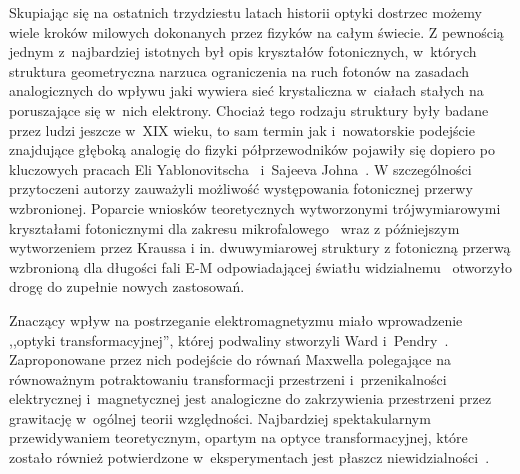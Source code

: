
Skupiając się na ostatnich trzydziestu latach historii optyki dostrzec możemy wiele kroków milowych dokonanych przez fizyków na całym świecie. Z pewnością jednym z~najbardziej istotnych był opis kryształów fotonicznych, w~których struktura geometryczna narzuca ograniczenia na ruch fotonów na zasadach analogicznych do wpływu jaki wywiera sieć krystaliczna w~ciałach stałych na poruszające się w~nich elektrony. Chociaż tego rodzaju struktury były badane przez ludzi jeszcze w~XIX wieku, to sam termin jak i~nowatorskie podejście znajdujące głęboką analogię do fizyki półprzewodników pojawiły się dopiero po kluczowych pracach Eli Yablonovitscha~\cite{yablonovitch1987inhibited} i~Sajeeva Johna~\cite{john1987strong}. W szczególności przytoczeni autorzy zauważyli możliwość występowania fotonicznej przerwy wzbronionej. Poparcie wniosków teoretycznych wytworzonymi trójwymiarowymi kryształami fotonicznymi dla zakresu mikrofalowego~\cite{yablonovitch1991photonic} wraz z późniejszym wytworzeniem przez Kraussa i in. dwuwymiarowej struktury z fotoniczną przerwą wzbronioną dla długości fali E-M odpowiadającej światłu widzialnemu~\cite{krauss1996two} otworzyło drogę do zupełnie nowych zastosowań.

Znaczący wpływ na postrzeganie elektromagnetyzmu miało wprowadzenie ,,optyki transformacyjnej'', której podwaliny stworzyli Ward i~Pendry~\cite{ward1996refraction}. Zaproponowane  przez nich podejście do równań Maxwella polegające na równoważnym potraktowaniu transformacji przestrzeni i~przenikalności elektrycznej i~magnetycznej jest analogiczne do zakrzywienia przestrzeni przez grawitację w~ogólnej teorii względności. Najbardziej spektakularnym przewidywaniem teoretycznym, opartym na optyce transformacyjnej, które zostało również potwierdzone w~eksperymentach jest płaszcz niewidzialności~\cite{schurig2006metamaterial}.

